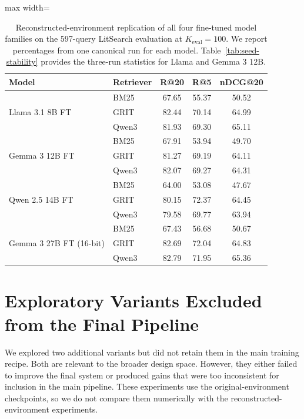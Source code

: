 \documentclass[pdflatex,sn-basic,Numbered]{sn-jnl}%
\theoremstyle{thmstyleone}%
\theoremstyle{thmstyletwo}%
\theoremstyle{thmstylethree}%
\begin{document}
\begin{table}[htbp]


\centering
\scriptsize
\setlength{\tabcolsep}{4pt}
\renewcommand{\arraystretch}{1.06}
\begin{adjustbox}{max width=\linewidth}
\begin{tabular}{l l c c c}
\hline
Model & Retriever & R@20 & R@5 & nDCG@20 \\
\hline
\multirow{3}{*}{Llama 3.1 8B FT}
 & BM25  & 67.65 & 55.37 & 50.52 \\
 & GRIT  & 82.44 & 70.14 & 64.99 \\
 & Qwen3 & 81.93 & 69.30 & 65.11 \\
\hline
\multirow{3}{*}{Gemma 3 12B FT}
 & BM25  & 67.91 & 53.94 & 49.70 \\
 & GRIT  & 81.27 & 69.19 & 64.11 \\
 & Qwen3 & 82.07 & 69.27 & 64.31 \\
\hline
\multirow{3}{*}{Qwen 2.5 14B FT}
 & BM25  & 64.00 & 53.08 & 47.67 \\
 & GRIT  & 80.15 & 72.37 & 64.45 \\
 & Qwen3 & 79.58 & 69.77 & 63.94 \\
\hline
\multirow{3}{*}{Gemma 3 27B FT (16-bit)}
 & BM25  & 67.43 & 56.68 & 50.67 \\
 & GRIT  & 82.69 & 72.04 & 64.83 \\
 & Qwen3 & 82.79 & 71.95 & 65.36 \\
\hline
\end{tabular}
\end{adjustbox}


\caption{Reconstructed-environment replication of all four fine-tuned model
families on the 597-query LitSearch evaluation at
$K_{\mathrm{eval}}=100$. We report percentages from one canonical run for each
model. Table~\ref{tab:seed-stability} provides the three-run statistics for Llama
and Gemma 3 12B.}
\label{tab:reconstructed-main-replication}
\end{table}

\FloatBarrier
\section{Exploratory Variants Excluded from the Final Pipeline}

We explored two additional variants but did not retain them in the main training
recipe. Both are relevant to the broader design space. However, they either
failed to improve the final system or produced gains that were too inconsistent for
inclusion in the main pipeline. These experiments use the original-environment
checkpoints, so we do not compare them numerically with the
reconstructed-environment experiments.
\end{document}
